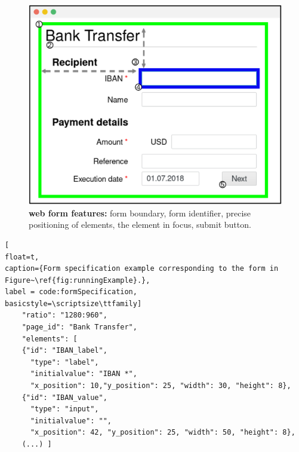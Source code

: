 
\begin{figure}[t]
	\centering
\includegraphics[width=0.7\linewidth]{img/runningExample.png}
	\caption{\textbf{\name{} web form features:} \one form boundary, \two form identifier, \three precise positioning of elements, \four the element in focus, \five submit button.
}
	\label{fig:runningExample}
\end{figure}

\begin{lstlisting}[
float=t,
caption={Form specification example corresponding to the form in Figure~\ref{fig:runningExample}.},
label = code:formSpecification,
basicstyle=\scriptsize\ttfamily]
    "ratio": "1280:960",
    "page_id": "Bank Transfer",
    "elements": [
    {"id": "IBAN_label",
      "type": "label",
      "initialvalue": "IBAN *",
      "x_position": 10,"y_position": 25, "width": 30, "height": 8},
    {"id": "IBAN_value",
      "type": "input",
      "initialvalue": "",
      "x_position": 42, "y_position": 25, "width": 50, "height": 8},
    (...) ]
\end{lstlisting}



